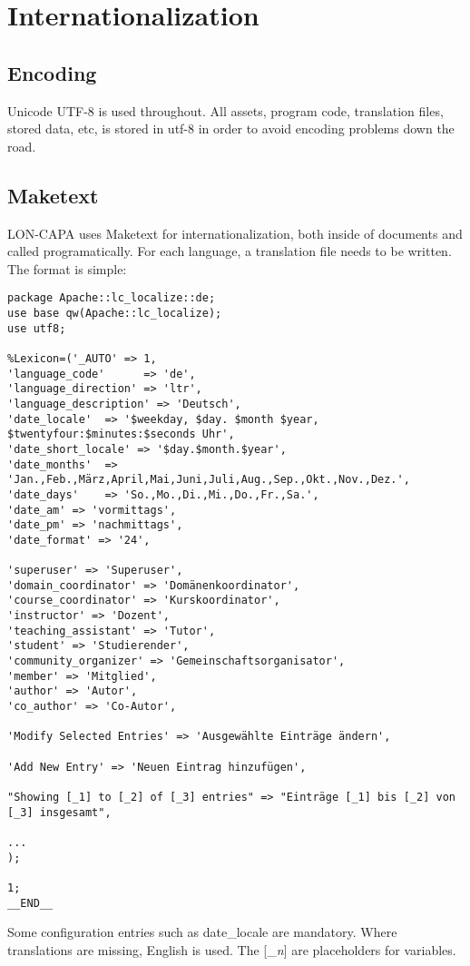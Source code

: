 \chapter{Internationalization}
\section{Encoding}
Unicode UTF-8 is used throughout. All assets, program code, translation files, stored data, etc, is stored in utf-8 in order to avoid encoding problems down the road.
\section{Maketext}
LON-CAPA uses Maketext for internationalization, both inside of documents and called programatically. For each language, a translation file needs to be written. The format is simple:
\begin{verbatim}
package Apache::lc_localize::de;
use base qw(Apache::lc_localize);
use utf8;

%Lexicon=('_AUTO' => 1,
'language_code'      => 'de',
'language_direction' => 'ltr',
'language_description' => 'Deutsch',
'date_locale'  => '$weekday, $day. $month $year, $twentyfour:$minutes:$seconds Uhr',
'date_short_locale' => '$day.$month.$year',
'date_months'  => 'Jan.,Feb.,März,April,Mai,Juni,Juli,Aug.,Sep.,Okt.,Nov.,Dez.',
'date_days'    => 'So.,Mo.,Di.,Mi.,Do.,Fr.,Sa.',
'date_am' => 'vormittags',
'date_pm' => 'nachmittags',
'date_format' => '24',

'superuser' => 'Superuser',
'domain_coordinator' => 'Domänenkoordinator',
'course_coordinator' => 'Kurskoordinator',
'instructor' => 'Dozent',
'teaching_assistant' => 'Tutor',
'student' => 'Studierender',
'community_organizer' => 'Gemeinschaftsorganisator',
'member' => 'Mitglied',
'author' => 'Autor',
'co_author' => 'Co-Autor',

'Modify Selected Entries' => 'Ausgewählte Einträge ändern',

'Add New Entry' => 'Neuen Eintrag hinzufügen',

"Showing [_1] to [_2] of [_3] entries" => "Einträge [_1] bis [_2] von [_3] insgesamt",

...
);

1;
__END__
\end{verbatim}
Some configuration entries such as date\_locale are mandatory. Where translations are missing, English is used. The [\_{\it n}] are placeholders for variables.

